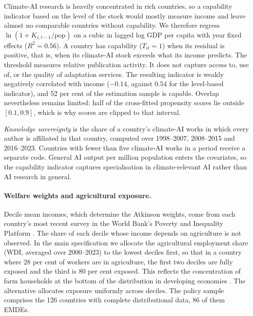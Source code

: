 Climate-AI research is heavily concentrated in rich countries, so a capability indicator based on
the level of the stock would mostly measure income and leave almost no comparable countries
without capability. We therefore regress $\ln(1+K_{i,t-1}/\text{pop})$ on a cubic
in lagged log GDP per capita with year fixed effects ($R^2=0.56$). A country has capability
($T_{it}=1$) when its residual is positive, that is, when its climate-AI stock exceeds what its income
predicts. The threshold measures relative publication activity. It does not capture access to,
use of, or the quality of adaptation services. The resulting indicator is weakly negatively correlated with income ($-0.14$, against
$0.54$ for the level-based indicator), and 52 per cent of the estimation sample is capable. Overlap
nevertheless remains limited: half of the cross-fitted propensity scores lie outside $[0.1,0.9]$,
which is why scores are clipped to that interval.

\emph{Knowledge sovereignty} is the share of a country's climate-AI works in which every author is
affiliated in that country, computed over 1998--2007, 2008--2015 and 2016--2023. Countries with fewer
than five climate-AI works in a period receive a separate code. General AI output per million
population enters the covariates, so the capability indicator captures specialisation in
climate-relevant AI rather than AI research in general.

\paragraph{Welfare weights and agricultural exposure.} Decile mean incomes, which determine the
Atkinson weights, come from each country's most recent survey in the World Bank's Poverty and
Inequality Platform \citep[PIP;][]{pip2026}. The share of each decile whose income depends on agriculture is not
observed. In the main specification we allocate the agricultural employment share (WDI, averaged
over 2000--2023) to the lowest deciles first, so that in a country where 28 per cent of workers are
in agriculture, the first two deciles are fully exposed and the third is 80 per cent exposed. This
reflects the concentration of farm households at the bottom of the distribution in developing
economies \citep{christiaensen2011}. The alternative allocates exposure uniformly across deciles.
The policy sample comprises the 126 countries with complete distributional data, 86 of them EMDEs.

